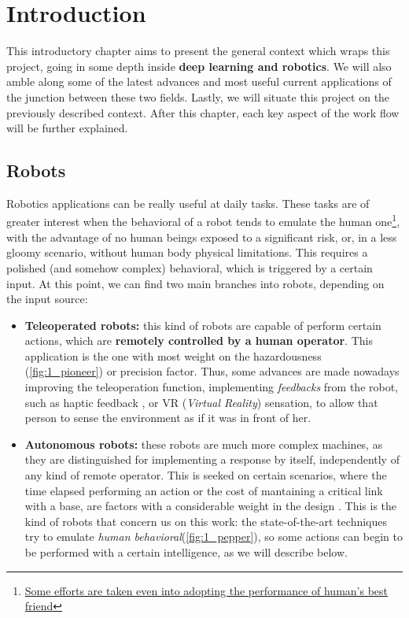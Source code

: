 \chapter{Introduction}

This introductory chapter aims to present the general context which wraps this project, going in some depth inside \textbf{deep learning and robotics}. We will also amble along some of the latest advances and most useful current applications of the junction between these two fields. Lastly, we will situate this project on the previously described context. After this chapter, each key aspect of the work flow will be further explained.\\

\section{Robots}

Robotics applications can be really useful at daily tasks. These tasks are of greater interest when the behavioral of a robot tends to emulate the human one\footnote{\href{https://www.engadget.com/2018/01/08/new-sony-aibo-first-impressions/}{Some efforts are taken even into adopting the performance of human's best friend}}, with the advantage of no human beings exposed to a significant risk, or, in a less gloomy scenario, without human body physical limitations. This requires a polished (and somehow complex) behavioral, which is triggered by a certain input. At this point, we can find two main branches into robots, depending on the input source:
\begin{itemize}
	\item \textbf{Teleoperated robots:} this kind of robots are capable of perform certain actions, which are \textbf{remotely controlled by a human operator}. This application is the one with most weight on the hazardousness (\autoref{fig:1_pioneer}) \cite{chernobyl-robot} or precision \cite{teleop-surgery} factor. Thus, some advances are made nowadays improving the teleoperation function, implementing \emph{feedbacks} from the robot, such as haptic feedback \cite{teleop-haptic}, or VR (\emph{Virtual Reality}) sensation, to allow that person to sense the environment as if it was in front of her.	
	
	\item \textbf{Autonomous robots:} these robots are much more complex machines, as they are distinguished for implementing a response by itself, independently of any kind of remote operator. This is seeked on certain scenarios, where the time elapsed performing an action or the cost of mantaining a critical link with a base, are factors with a considerable weight in the design \cite{ai-space}. This is the kind of robots that concern us on this work: the state-of-the-art techniques try to emulate \emph{human behavioral}(\autoref{fig:1_pepper}), so some actions can begin to be performed with a certain intelligence, as we will describe below.
\end{itemize}


